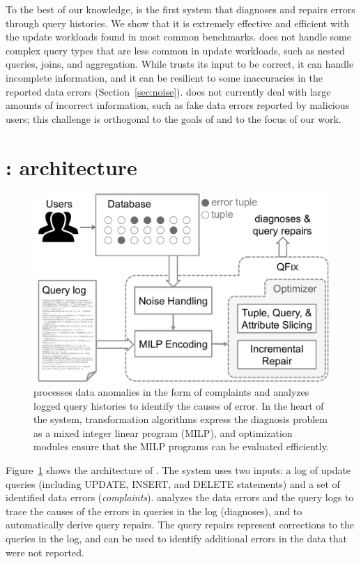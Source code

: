 To the best of our knowledge, \sys is the first system that diagnoses
and repairs errors through query histories. We show that it is
extremely effective and efficient with the update workloads found in
most common benchmarks. \sys does not handle some complex query types
that are less common in update workloads, such as nested queries,
joins, and aggregation. While \sys trusts its input to be correct, it
can handle incomplete information, and it can be resilient to some
inaccuracies in the reported data errors (Section~\ref{sec:noise}).
\sys does not currently deal with large amounts of incorrect
information, such as fake data errors reported by malicious users;
this challenge is orthogonal to the goals of \sys and to the focus of
our work.




\section{{\large\textbf{\sys}}: architecture}


\begin{figure}[t]
    \centering
        \includegraphics[scale=0.35]{figures/architecture}
    \caption{\sys processes data anomalies in the form of complaints and analyzes logged query histories to identify the causes of error. In the heart of the system, transformation algorithms express the diagnosis problem as a mixed integer linear program (MILP), and optimization modules ensure that the MILP programs can be evaluated efficiently.}
    \label{fig:architecture}
\end{figure}

Figure~\ref{fig:architecture} shows the architecture of \sys. The system uses
two inputs: a log of update queries (including UPDATE, INSERT, and DELETE
statements) and a set of identified data errors (\emph{complaints}). \sys
analyzes the data errors and the query logs to trace the causes of the errors
in queries in the log (diagnoses), and to automatically derive query repairs.
The query repairs represent corrections to the queries in the log, and can be
used to identify additional errors in the data that were not reported.

